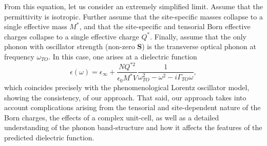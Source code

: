 \documentclass[aps,prb,twocolumn,
	groupedaddress,superscriptaddress,
	amsfonts,amssymb,amsmath,floatfix,
	citeautoscript]{revtex4-1}
\begin{document}
From this equation, let us consider an extremely simplified limit. Assume that the permittivity is isotropic. Further assume that the site-specific masses collapse to a single effective mass $M^*$, and that the site-specific and tensorial Born effective charges collapse to a single effective charge $Q^*$. Finally, assume that the only phonon with oscillator strength (non-zero $\mathbf{S}$) is the transverse optical phonon at frequency $\omega_{TO}$. In this case, one arises at a dielectric function 
\begin{equation}
\epsilon(\omega) = \epsilon_{\infty} + \frac{NQ^{*2}}{\epsilon_0 M^*V}\frac{1}{\omega^2_{TO}-\omega^2-i\Gamma_{TO}\omega},
\end{equation}
which coincides precisely with the phenomenological Lorentz oscillator model, showing the consistency, of our approach. That said, our approach takes into account complications arising from the tensorial and site-dependent nature of the Born charges, the effects of a complex unit-cell, as well as a detailed understanding of the phonon band-structure and how it affects the features of the predicted dielectric function.
\end{document}
